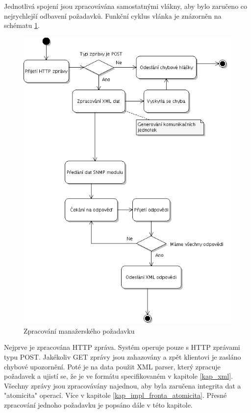 Jednotlivá spojení jsou zpracovávána samostatnými vlákny, aby bylo zaručeno co nejrychlejší odbavení požadavků. Funkční cyklus vlánka je znázorněn
na schématu \ref{obr_impl_xmlmod_vlakno}. 
\begin{figure}[htp]
	\begin{center}
		\includegraphics[width=13cm]{obrazky/05_xmlmod_vlakno.png}
		\caption{Zpracování manažerského požadavku}
		\label{obr_impl_xmlmod_vlakno}
	\end{center}
\end{figure}

Nejprve je zpracována HTTP zpráva. Systém operuje pouze s HTTP zprávami typu POST. Jakékoliv GET zprávy jsou zahazovány a zpět klientovi je zasláno
chybové upozornění. Poté je na data použit XML parser, který zpracuje požadavek a ujistí se, že je ve formátu specifikovaném v kapitole \ref{kap_xml}.
Všechny zprávy jsou zpracovávány najednou, aby byla zaručena integrita dat a "atomicita" operací. Více v kapitole \ref{kap_impl_fronta_atomicita}. 
Přesné zpracování jednoho požadavku je popsáno dále v této kapitole.

